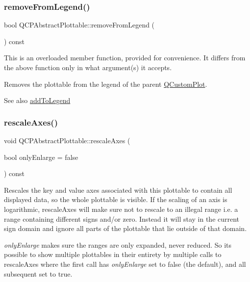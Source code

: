 \subsubsection{\texorpdfstring{remove\+From\+Legend()}{removeFromLegend()}\hspace{0.1cm}{\footnotesize\ttfamily [2/2]}}
{\footnotesize\ttfamily bool Q\+C\+P\+Abstract\+Plottable\+::remove\+From\+Legend (\begin{DoxyParamCaption}{ }\end{DoxyParamCaption}) const}

This is an overloaded member function, provided for convenience. It differs from the above function only in what argument(s) it accepts.

Removes the plottable from the legend of the parent \hyperlink{class_q_custom_plot}{Q\+Custom\+Plot}.

\begin{DoxySeeAlso}{See also}
\hyperlink{class_q_c_p_abstract_plottable_aa64e93cb5b606d8110d2cc0a349bb30f}{add\+To\+Legend} 
\end{DoxySeeAlso}
\mbox{\label{class_q_c_p_abstract_plottable_a1491c4a606bccd2d09e65e11b79eb882}} 
\subsubsection{\texorpdfstring{rescale\+Axes()}{rescaleAxes()}}
{\footnotesize\ttfamily void Q\+C\+P\+Abstract\+Plottable\+::rescale\+Axes (\begin{DoxyParamCaption}\item[{bool}]{only\+Enlarge = {\ttfamily false} }\end{DoxyParamCaption}) const}

Rescales the key and value axes associated with this plottable to contain all displayed data, so the whole plottable is visible. If the scaling of an axis is logarithmic, rescale\+Axes will make sure not to rescale to an illegal range i.\+e. a range containing different signs and/or zero. Instead it will stay in the current sign domain and ignore all parts of the plottable that lie outside of that domain.

{\itshape only\+Enlarge} makes sure the ranges are only expanded, never reduced. So it\textquotesingle{}s possible to show multiple plottables in their entirety by multiple calls to rescale\+Axes where the first call has {\itshape only\+Enlarge} set to false (the default), and all subsequent set to true.

